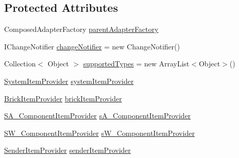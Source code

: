 \subsection*{Protected Attributes}
\begin{DoxyCompactItemize}
\item 
Composed\-Adapter\-Factory \hyperlink{classshootingmachineemfmodel_1_1provider_1_1_shootingmachineemfmodel_item_provider_adapter_factory_aefa932b17c6961fbfbead5540d214176}{parent\-Adapter\-Factory}
\item 
I\-Change\-Notifier \hyperlink{classshootingmachineemfmodel_1_1provider_1_1_shootingmachineemfmodel_item_provider_adapter_factory_acc6bc88e6f012b19c0bb03bc1d36f806}{change\-Notifier} = new Change\-Notifier()
\item 
Collection$<$ Object $>$ \hyperlink{classshootingmachineemfmodel_1_1provider_1_1_shootingmachineemfmodel_item_provider_adapter_factory_add0fefff4b45608069578e21ac84a4ec}{supported\-Types} = new Array\-List$<$Object$>$()
\item 
\hyperlink{classshootingmachineemfmodel_1_1provider_1_1_system_item_provider}{System\-Item\-Provider} \hyperlink{classshootingmachineemfmodel_1_1provider_1_1_shootingmachineemfmodel_item_provider_adapter_factory_a0bf6dc3202dfa65a30a0b9ac9a5f24b9}{system\-Item\-Provider}
\item 
\hyperlink{classshootingmachineemfmodel_1_1provider_1_1_brick_item_provider}{Brick\-Item\-Provider} \hyperlink{classshootingmachineemfmodel_1_1provider_1_1_shootingmachineemfmodel_item_provider_adapter_factory_a106658c0a166931fc362f0d208dc170e}{brick\-Item\-Provider}
\item 
\hyperlink{classshootingmachineemfmodel_1_1provider_1_1_s_a___component_item_provider}{S\-A\-\_\-\-Component\-Item\-Provider} \hyperlink{classshootingmachineemfmodel_1_1provider_1_1_shootingmachineemfmodel_item_provider_adapter_factory_a6bf964da7d902c1bcf16405b588c0ae4}{s\-A\-\_\-\-Component\-Item\-Provider}
\item 
\hyperlink{classshootingmachineemfmodel_1_1provider_1_1_s_w___component_item_provider}{S\-W\-\_\-\-Component\-Item\-Provider} \hyperlink{classshootingmachineemfmodel_1_1provider_1_1_shootingmachineemfmodel_item_provider_adapter_factory_a4ca6904ab2b47792a1429a1732de0084}{s\-W\-\_\-\-Component\-Item\-Provider}
\item 
\hyperlink{classshootingmachineemfmodel_1_1provider_1_1_sender_item_provider}{Sender\-Item\-Provider} \hyperlink{classshootingmachineemfmodel_1_1provider_1_1_shootingmachineemfmodel_item_provider_adapter_factory_ac21bc8607365abc11611a860fa96fd0d}{sender\-Item\-Provider}

\end{DoxyCompactItemize}

